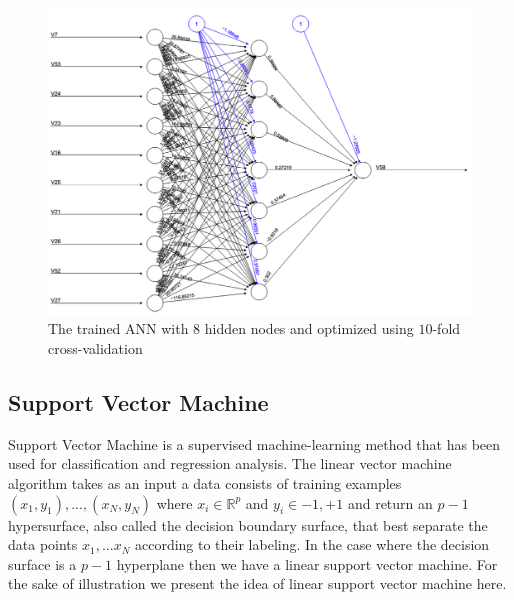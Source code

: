 \documentclass[11pt,oneside,reqno]{amsart}
\theoremstyle{definition}
\theoremstyle{definition}
\theoremstyle{remark}
\numberwithin{equation}{section}
\numberwithin{equation}{section}
\begin{document}
\begin{figure}[H]
  \centering
   {\includegraphics[keepaspectratio=true, width=.95\textwidth]{NN}
   \caption{The trained ANN with $8$ hidden nodes and optimized using $10$-fold cross-validation}
  \label{NN}}
\end{figure}


\subsection{Support Vector Machine}
Support Vector Machine is a supervised machine-learning method that has been used for classification and regression analysis. The linear vector machine algorithm takes as an input a data consists of training examples $(x_1,y_1),...,(x_N,y_N)$ where $x_i\in \mathbb{R}^p$ and $y_i\in{-1,+1}$ and return an $p-1$ hypersurface, also called the decision boundary surface, that best separate the data points $x_1,...x_N$ according to their labeling. In the case where the decision surface is a $p-1$ hyperplane then we have a linear support vector machine. For the sake of illustration we present  the idea of linear support vector machine here.
\end{document}
